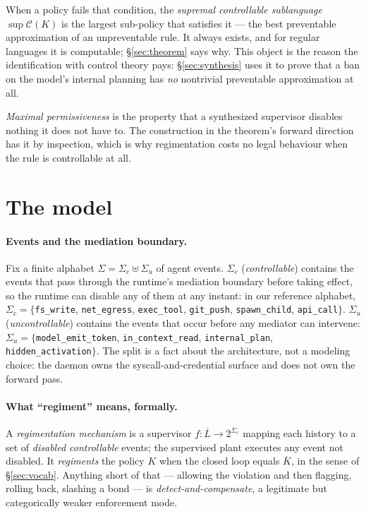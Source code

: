\documentclass[11pt,a4paper]{article}  \usepackage{mdframed} \usepackage{graphicx}
\begin{document}
When a policy fails that condition, the \emph{supremal controllable sublanguage} $\sup\mathcal{C}(K)$ is the largest
sub-policy that satisfies it --- the best preventable approximation of an unpreventable rule. It always exists, and for
regular languages it is computable; \S\ref{sec:theorem} says why. This object
is the reason the identification with control theory pays: \S\ref{sec:synthesis} uses it to prove that a ban on the model's
internal planning has \emph{no} nontrivial preventable approximation at all.

\emph{Maximal permissiveness} is the property that a synthesized supervisor disables nothing it does not have to. The
construction in the theorem's forward direction has it by inspection, which is why regimentation costs no legal behaviour
when the rule is controllable at all.

\section{The model}\label{sec:model} \paragraph{Events and the mediation boundary.} Fix a finite alphabet
$\Sigma=\Sigma_c\uplus\Sigma_u$ of agent events. $\Sigma_c$ (\emph{controllable}) contains the events that pass through the
runtime's mediation boundary before taking effect, so the runtime can disable any of them at any instant: in our reference
alphabet, $\Sigma_c=\{$\texttt{fs\_write}, \texttt{net\_egress}, \texttt{exec\_tool}, \texttt{git\_push},
\texttt{spawn\_child}, \texttt{api\_call}$\}$. $\Sigma_u$ (\emph{uncontrollable}) contains the events that occur before any
mediator can intervene: $\Sigma_u=\{$\texttt{model\_emit\_token}, \texttt{in\_context\_read}, \texttt{internal\_plan},
\texttt{hidden\_activation}$\}$. The split is a fact about the architecture, not a modeling choice: the daemon owns the
syscall-and-credential surface and does not own the forward pass.

\paragraph{What ``regiment'' means, formally.} A \emph{regimentation mechanism} is a supervisor $f:\overline{L}\to
2^{\Sigma_c}$ mapping each history to a set of \emph{disabled controllable} events; the supervised plant executes any event
not disabled. It \emph{regiments} the policy $K$ when the closed loop equals $\overline{K}$, in the sense of
\S\ref{sec:vocab}. Anything short of that --- allowing the violation and then flagging, rolling back, slashing a bond --- is
\emph{detect-and-compensate}, a legitimate but categorically weaker enforcement mode.
\end{document}
